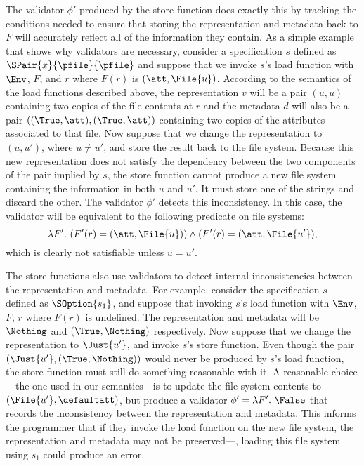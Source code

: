 The validator $\phi'$ produced by the store function does exactly this
by tracking the conditions needed to ensure that storing the
representation and metadata back to $F$ will accurately reflect all of
the information they contain. As a simple example that shows why
validators are necessary, consider a specification $s$ defined as
$\SPair{x}{\pfile}{\pfile}$ and suppose that we invoke $s$'s load
function with $\Env$, $F$, and $r$ where $F(r)$ is
$(\att,\File{u})$. According to the semantics of the load functions
described above, the representation $v$ will be a pair $(u,u)$
containing two copies of the file contents at $r$ and the metadata $d$
will also be a pair $((\True,\att),(\True,\att))$ containing two
copies of the attributes associated to that file. Now suppose that we
change the representation to $(u,u')$, where $u \neq u'$, and store
the result back to the file system. Because this new representation
does not satisfy the dependency between the two components of the pair
implied by $s$, the store function cannot produce a new file system
containing the information in both $u$ and $u'$. It must store one of
the strings and discard the other. The validator $\phi'$ detects this
inconsistency. In this case, the validator will be equivalent to the
following predicate on file systems:
%
\[
\lambda F'.~ (F'(r) = (\att,\File{u})) \wedge (F'(r) = (\att,\File{u'}),
\]
%
which is clearly not satisfiable unless $u = u'$.

The store functions also use validators to detect internal
inconsistencies between the representation and metadata. For example,
consider the specification $s$ defined as $\SOption{s_1}$, and suppose
that invoking $s$'s load function with $\Env$, $F$, $r$ where $F(r)$
is undefined. The representation and metadata will be $\Nothing$ and
$(\True,\Nothing)$ respectively. Now suppose that we change the
representation to $\Just{u'}$, and invoke $s$'s store function. Even
though the pair $(\Just{u'}, (\True,\Nothing))$ would never be
produced by $s$'s load function, the store function must still do
something reasonable with it. A reasonable choice---the one used in
our semantics---is to update the file system contents to
$(\File{u'},\defaultatt)$, but produce a validator $\phi' = \lambda
F'.~ \False$ that records the inconsistency between the representation
and metadata. This informs the programmer that if they invoke the load
function on the new file system, the representation and metadata may
not be preserved---\eg, loading this file system using $s_1$ could
produce an error.

